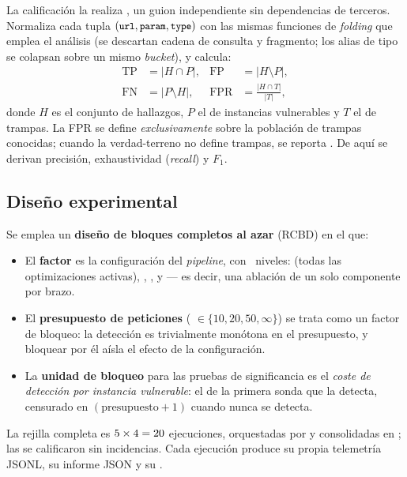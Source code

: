 La calificación la realiza , un guion independiente
sin dependencias de terceros. Normaliza cada tupla
$(\texttt{\small url}, \texttt{\small param}, \texttt{\small type})$ con las mismas funciones de
\emph{folding} que emplea el análisis (se descartan cadena de consulta y
fragmento; los alias de tipo se colapsan sobre un mismo \emph{bucket}), y
calcula:
\begin{align}
  \mathrm{TP} &= \lvert H \cap P \rvert, &
  \mathrm{FP} &= \lvert H \setminus P \rvert, \nonumber\\
  \mathrm{FN} &= \lvert P \setminus H \rvert, &
  \mathrm{FPR} &= \frac{\lvert H \cap T \rvert}{\lvert T \rvert},
  \label{eq:metricas}
\end{align}
donde $H$ es el conjunto de hallazgos, $P$ el de instancias vulnerables y $T$
el de trampas. La FPR se define \emph{exclusivamente} sobre la población de
trampas conocidas; cuando la verdad-terreno no define trampas, se reporta
. De aquí se derivan precisión, exhaustividad (\emph{recall}) y
$F_1$.

\subsection{Diseño experimental}
\label{sec:diseno}

Se emplea un \textbf{diseño de bloques completos al azar} (RCBD) en el que:

\begin{itemize}
  \item El \textbf{factor} es la configuración del \emph{pipeline}, con
  \NumCondiciones{}~niveles:  (todas las optimizaciones
  activas), , , 
  y  --- es decir, una ablación de un solo componente
  por brazo.
  \item El \textbf{presupuesto de peticiones}
  ( $\in \{10, 20, 50, \infty\}$) se trata como un
  factor de bloqueo: la detección es trivialmente monótona en el presupuesto,
  y bloquear por él aísla el efecto de la configuración.
  \item La \textbf{unidad de bloqueo} para las pruebas de significancia es el
  \emph{coste de detección por instancia vulnerable}: el 
  de la primera sonda que la detecta, censurado en $(\text{presupuesto}+1)$
  cuando nunca se detecta.
\end{itemize}

La rejilla completa es $5{} \times 4 = 20{}$
ejecuciones, orquestadas por  y consolidadas en
; las \NumCorridas{} se calificaron sin
incidencias. Cada ejecución produce su propia telemetría JSONL, su informe
JSON y su .

